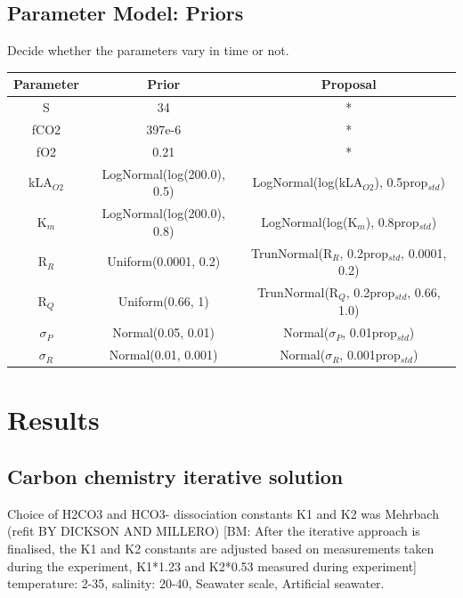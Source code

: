 \documentclass{ruthesis}
\begin{document}
\subsection{Parameter Model: Priors}
Decide whether the parameters vary in time or not.




\begin{tabular}{c | c  |  c}
	Parameter & Prior &  Proposal \\ \hline
	S  & 34 & * \\
	fCO2  & 397e-6 &  *  \\
	fO2  & 0.21 &  *  \\
	kLA$_{O2}$  & LogNormal(log(200.0), 0.5)  & LogNormal(log(kLA$_{O2}$), 0.5prop$_{std}$) \\
	K$_m$ &  LogNormal(log(200.0), 0.8)  & LogNormal(log(K$_m$), 0.8prop$_{std}$) \\
	R$_R$  & Uniform(0.0001, 0.2) &  TrunNormal(R$_R$, 0.2prop$_{std}$, 0.0001, 0.2) \\
	R$_Q$  & Uniform(0.66, 1) &  TrunNormal(R$_Q$, 0.2prop$_{std}$, 0.66, 1.0)
	 \\
	$\sigma_P$ & Normal(0.05, 0.01) & Normal($\sigma_P$, 0.01prop$_{std}$) \\
	$\sigma_R$ & Normal(0.01, 0.001) & Normal($\sigma_R$, 0.001prop$_{std}$) \\
	
\end{tabular}
\newpage


\FloatBarrier

\section{Results}


\subsection{Carbon chemistry iterative solution}

Choice of H2CO3 and HCO3- dissociation constants K1 and K2 was Mehrbach (refit BY DICKSON AND MILLERO) [BM: After the iterative approach is finalised, the K1 and K2 constants are adjusted based on measurements taken during the experiment, K1*1.23 and K2*0.53 measured during experiment] temperature: 2-35,  salinity: 20-40, Seawater scale, Artificial seawater.
\end{document}
